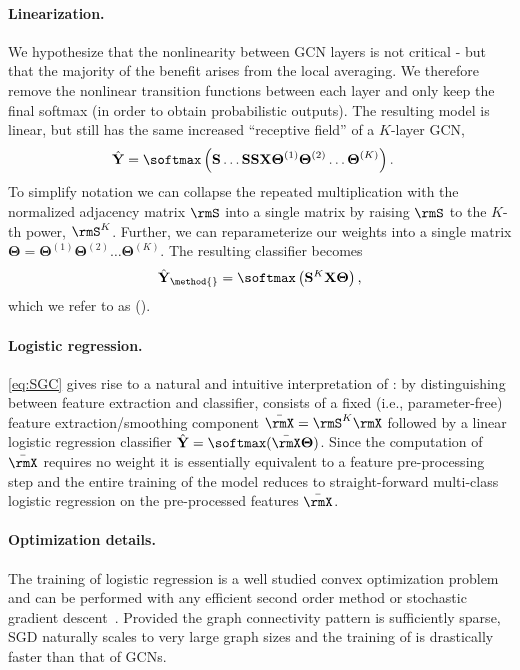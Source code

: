 \paragraph{Linearization.}
We hypothesize that the nonlinearity between GCN layers is not critical - but that the majority of the benefit arises from the local averaging. We therefore remove the nonlinear transition functions between each layer and only keep the final softmax (in order to obtain probabilistic outputs). 
The resulting model is linear, but still has the same increased ``receptive field'' of a $K$-layer GCN,
\begin{align}
    \hat{\mathbf{Y}} & = \softmax\left(\mathbf{S}\ldots\mathbf{S}\mathbf{S} \mathbf{X} \boldsymbol{\Theta}^{(1)}\boldsymbol{\Theta}^{(2)}\ldots\boldsymbol{\Theta}^{(K)} \right).
    \end{align}
To simplify notation we can collapse the repeated multiplication with the normalized adjacency matrix $\rmS$ into a single matrix by raising $\rmS$ to the $K$-th power, $\rmS^K$. Further, we can reparameterize our weights into a single matrix  $\boldsymbol{\Theta}=\boldsymbol{\Theta}^{(1)} \boldsymbol{\Theta}^{(2)} \ldots \boldsymbol{\Theta}^{(K)}$.  The resulting classifier becomes
\begin{equation}
    \hat{\mathbf{Y}}_{\text{\method{}}}=\softmax\left(\mathbf{S}^K \mathbf{X} \boldsymbol{\Theta} \right),\label{eq:SGC}
\end{equation}
which we refer to as \Method{} (\method{}). 

\paragraph{Logistic regression.} \autoref{eq:SGC} gives rise to a  natural and intuitive interpretation of \method{}: by distinguishing between feature extraction and classifier, \method{} consists of a fixed (i.e., parameter-free) feature extraction/smoothing component $\bar{\rmX}= \rmS^K \rmX$ followed by a linear logistic regression classifier $\hat{\mathbf{Y}}=\softmax(\bar{\rmX}\boldsymbol{\Theta})$. Since the computation of $\bar{\rmX}$ requires no weight it is essentially equivalent to a feature pre-processing step and the entire training of the model reduces to straight-forward multi-class logistic regression on the pre-processed features $\bar \rmX$.


\paragraph{Optimization details.} The training of logistic regression is a well studied convex optimization problem and can be performed with any efficient second order method or stochastic gradient descent~\cite{bottou2010large}. Provided the graph connectivity pattern  is sufficiently sparse, SGD naturally scales to very large graph sizes and the training of \method{} is  drastically faster than that of GCNs.   

